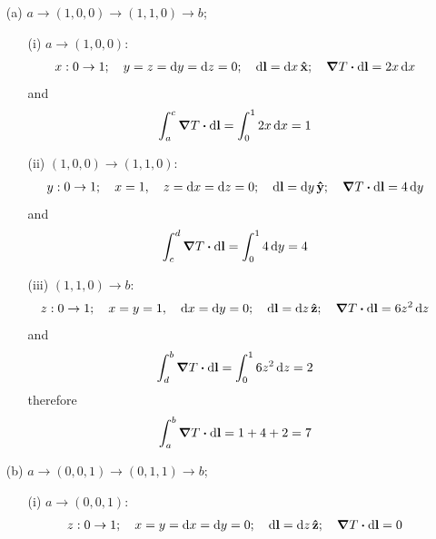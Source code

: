 \documentclass[../main.tex]{subfiles}
\begin{document}
\begin{itemize}
    \item[(a)] $a \to (1,0,0) \to (1,1,0) \to b$;
    \begin{enumerate}
        \item[(i)] $a \to (1,0,0)$:
        \begin{align*}
                x: 0 \to 1; \quad y = z = \dd{y} = \dd{z} = 0; \quad \dd{\vb{l}} = \dd{x} \vu{x};
                \quad \grad{T} \vdot \dd{\vb{l}} = 2x \dd{x}
        \end{align*}
        and
        \begin{align*}
            \int_a^c \grad{T} \vdot \dd{\vb{l}} = \int_0^1 2x \dd{x} = 1
        \end{align*}
        \item[(ii)] $(1,0,0) \to (1,1,0)$:
        \begin{align*}
            y: 0 \to 1; \quad x = 1, \quad z = \dd{x} = \dd{z} = 0; \quad \dd{\vb{l}} = \dd{y} \vu{y};
                \quad \grad{T} \vdot \dd{\vb{l}} = 4 \dd{y}
        \end{align*}
        and
        \begin{align*}
            \int_c^d \grad{T} \vdot \dd{\vb{l}} = \int_0^1 4 \dd{y} = 4
        \end{align*}
        \item[(iii)] $(1,1,0) \to b$:
        \begin{align*}
            z: 0 \to 1; \quad x = y = 1, \quad \dd{x} = \dd{y} = 0; \quad \dd{\vb{l}} = \dd{z} \vu{z};
                \quad \grad{T} \vdot \dd{\vb{l}} = 6z^2 \dd{z}
        \end{align*}
        and
        \begin{align*}
            \int_d^b \grad{T} \vdot \dd{\vb{l}} = \int_0^1 6z^2 \dd{z} = 2
        \end{align*}
        therefore
        \begin{align*}
            \int_a^b \grad{T} \vdot \dd{\vb{l}} = 1 + 4 + 2 = 7
        \end{align*}
    \end{enumerate}
    \item[(b)] $a \to (0,0,1) \to (0,1,1) \to b$;
    \begin{enumerate}
        \item [(i)] $a \to (0,0,1)$:
        \begin{align*}
            z: 0 \to 1;\quad x = y = \dd{x} = \dd{y} = 0; \quad \dd{\vb{l}} = \dd{z} \vu{z};
                \quad \grad{T} \vdot \dd{\vb{l}} = 0

\end{align*}
\end{enumerate}
\end{itemize}
\end{document}
